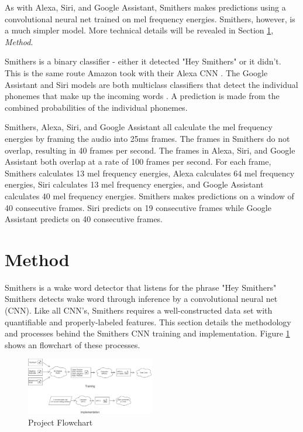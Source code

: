 \documentclass[conference]{IEEEtran}
\begin{document}
As with Alexa, Siri, and Google Assistant, Smithers makes predictions
using a convolutional neural net trained on mel frequency energies.
Smithers, however, is a much simpler model.
More technical details will be revealed in Section \ref{sec:method}, \textit{Method}.

Smithers is a binary classifier - either it detected "Hey Smithers" or it didn't.
This is the same route Amazon took with their Alexa CNN \cite{wordstart}.
The Google Assistant and Siri models are both multiclass classifiers that
detect the individual phonemes that make up the incoming words \cite{smallfoot}\cite{Efficient}.
A prediction is made from the combined probabilities of the individual phonemes.

Smithers, Alexa, Siri, and Google Assistant all calculate the mel frequency energies
by framing the audio into 25ms frames.
The frames in Smithers do not overlap, resulting in 40 frames per second.
The frames in Alexa, Siri, and Google Assistant both overlap at a rate of 100 frames per second.
For each frame, Smithers calculates 13 mel frequency energies, Alexa calculates 64 mel frequency energies, 
Siri calculates 13 mel frequency energies, and Google Assistant calculates 40 mel frequency energies.
Smithers makes predictions on a window of 40 consecutive frames. 
Siri predicts on 19 consecutive frames while Google Assistant predicts on 40 consecutive frames.

\section{Method} \label{sec:method}

Smithers is a wake word detector that listens for the phrase "Hey Smithers"
Smithers detects wake word through inference by a convolutional neural net (CNN).
Like all CNN's, Smithers requires a well-constructed data set
with quantifiable and properly-labeled features.
This section details the methodology and processes
behind the Smithers CNN training and implementation.
Figure \ref{fig:flow} shows an flowchart of these processes.

\begin{figure}[htbp]
    \centerline{\includegraphics[width=0.5\textwidth]{figs/flow.png}}
    \caption{Project Flowchart}
    \label{fig:flow}
\end{figure}
\end{document}
